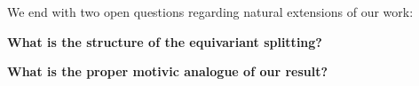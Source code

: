 We end with two open questions regarding natural extensions of our work:

\textbf{What is the structure of the equivariant splitting?}

\textbf{What is the proper motivic analogue of our result?}




